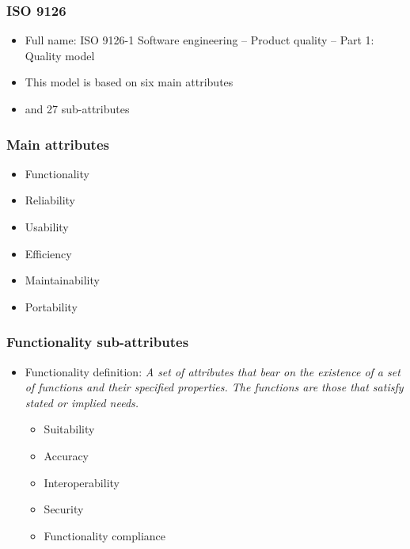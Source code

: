 \documentclass{beamer}
\begin{document}

\begin{frame}
 \frametitle{ISO 9126}
 \begin{itemize}
 \item Full name: ISO 9126-1 Software engineering -- Product quality -- Part 1: Quality model 
 \item This model is based on six main attributes
 \item and 27 sub-attributes
 \end{itemize}
\end{frame}


\begin{frame}
 \frametitle{Main attributes}
 \begin{itemize}
  \item Functionality
  \item Reliability
  \item Usability
  \item Efficiency
  \item Maintainability
  \item Portability
 \end{itemize}
\end{frame}


\begin{frame}
 \frametitle{Functionality sub-attributes}
 \begin{itemize}
 \item Functionality definition: \textit{A set of attributes that bear on the existence of a set of functions and their specified properties. The functions are those that satisfy stated or implied needs.}
 \begin{itemize}
 \item Suitability
 \item Accuracy
 \item Interoperability
 \item Security
 \item Functionality compliance
 \end{itemize}

 \end{itemize}
\end{frame}
\end{document}
